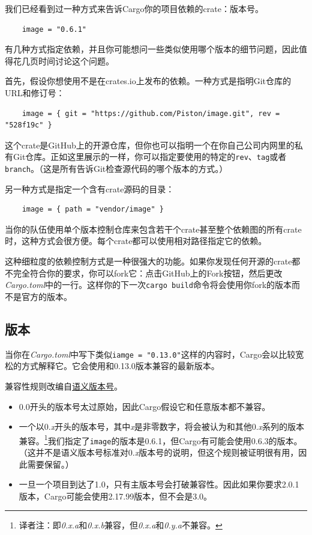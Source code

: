 我们已经看到过一种方式来告诉Cargo你的项目依赖的crate：版本号。
\begin{verbatim}
    image = "0.6.1"
\end{verbatim}

有几种方式指定依赖，并且你可能想问一些类似使用哪个版本的细节问题，因此值得花几页时间讨论这个问题。

首先，假设你想使用不是在crates.io上发布的依赖。一种方式是指明Git仓库的URL和修订号：
\begin{verbatim}
    image = { git = "https://github.com/Piston/image.git", rev = "528f19c" }
\end{verbatim}

这个crate是GitHub上的开源仓库，但你也可以指明一个在你自己公司内网里的私有Git仓库。正如这里展示的一样，你可以指定要使用的特定的\texttt{rev}、\texttt{tag}或者\texttt{branch}。（这是所有告诉Git检查源代码的哪个版本的方式。）

另一种方式是指定一个含有crate源码的目录：
\begin{verbatim}
    image = { path = "vendor/image" }
\end{verbatim}

当你的队伍使用单个版本控制仓库来包含若干个crate甚至整个依赖图的所有crate时，这种方式会很方便。每个crate都可以使用相对路径指定它的依赖。

这种细粒度的依赖控制方式是一种很强大的功能。如果你发现任何开源的crate都不完全符合你的要求，你可以fork它：点击GitHub上的Fork按钮，然后更改\emph{Cargo.toml}中的一行。这样你的下一次\texttt{cargo build}命令将会使用你fork的版本而不是官方的版本。

\subsection{版本}
当你在\emph{Cargo.toml}中写下类似\texttt{iamge = "0.13.0"}这样的内容时，Cargo会以比较宽松的方式解释它。它会使用和0.13.0版本兼容的最新版本。

兼容性规则改编自\href{https://semver.org/}{语义版本号}。

\begin{itemize}
    \item 0.0开头的版本号太过原始，因此Cargo假设它和任意版本都不兼容。
    \item 一个以0.\emph{x}开头的版本号，其中\emph{x}是非零数字，将会被认为和其他0.\emph{x}系列的版本兼容。\footnote{译者注：即\emph{0.x.a}和\emph{0.x.b}兼容，但\emph{0.x.a}和\emph{0.y.a}不兼容。}我们指定了\texttt{image}的版本是0.6.1，但Cargo有可能会使用0.6.3的版本。（这并不是语义版本号标准对0.\emph{x}版本号的说明，但这个规则被证明很有用，因此需要保留。）
    \item 一旦一个项目到达了1.0，只有主版本号会打破兼容性。因此如果你要求2.0.1版本，Cargo可能会使用2.17.99版本，但不会是3.0。
\end{itemize}


